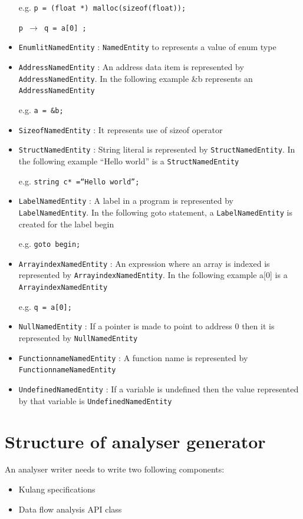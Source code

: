 \documentclass[11pt,a4paper,openright]{report}
\begin{document}
\begin{itemize}
e.g. \texttt{p = (float *) malloc(sizeof(float));}

\hspace{8mm}\texttt{p $\rightarrow$ q  = a[0] ;}

\item \texttt{EnumlitNamedEntity} : \texttt{NamedEntity} to represents a value of enum type

\item \texttt{AddressNamedEntity} : An address data item is represented by \texttt{AddressNamedEntity}. In the following example \&b represents an \texttt{AddressNamedEntity}

e.g. \texttt{a = \&b;}

\item \texttt{SizeofNamedEntity} : It represents use of sizeof operator

\item \texttt{StructNamedEntity} : String literal is represented by \texttt{StructNamedEntity}. In the following example ``Hello world'' is a \texttt{StructNamedEntity}

e.g. \texttt{string c* =``Hello world'';}

\item \texttt{LabelNamedEntity} : A label in a program is represented by \texttt{LabelNamedEntity}. In the following goto statement, a \texttt{LabelNamedEntity} is created for the label begin

e.g. \texttt{goto begin;}


\item \texttt{ArrayindexNamedEntity} : An expression where an array is indexed is represented by \texttt{ArrayindexNamedEntity}. In the following example a[0] is a 
\texttt{ArrayindexNamedEntity}

e.g. \texttt{q = a[0];}

\item \texttt{NullNamedEntity} : If a pointer is made to point to address 0 then it is represented by \texttt{NullNamedEntity}
\item \texttt{FunctionnameNamedEntity} : A function name is represented by \texttt{FunctionnameNamedEntity}
\item \texttt{UndefinedNamedEntity} : If a variable is undefined then the value represented by that variable is \texttt{UndefinedNamedEntity}

 
 
\end{itemize}


\section{Structure of analyser generator}
An analyser writer needs to write two following components:
\begin{itemize}
 \item Kulang specifications~\cite{prism}
 \item Data flow analysis API class
\end{itemize}
\end{document}
